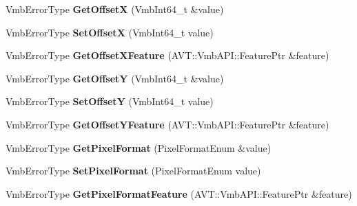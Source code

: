 \begin{DoxyCompactItemize}
\item 
\hypertarget{classMakoCamera_a76b13f9d016ff54f0280801edd307cc5}{Vmb\-Error\-Type {\bfseries Get\-Offset\-X} (Vmb\-Int64\-\_\-t \&value)}\label{classMakoCamera_a76b13f9d016ff54f0280801edd307cc5}

\item 
\hypertarget{classMakoCamera_ae622c0b507b79f37c531b7468c877be9}{Vmb\-Error\-Type {\bfseries Set\-Offset\-X} (Vmb\-Int64\-\_\-t value)}\label{classMakoCamera_ae622c0b507b79f37c531b7468c877be9}

\item 
\hypertarget{classMakoCamera_a89ecbe76ba442ef6b7a00701c9a76c0e}{Vmb\-Error\-Type {\bfseries Get\-Offset\-X\-Feature} (A\-V\-T\-::\-Vmb\-A\-P\-I\-::\-Feature\-Ptr \&feature)}\label{classMakoCamera_a89ecbe76ba442ef6b7a00701c9a76c0e}

\item 
\hypertarget{classMakoCamera_ae31b0f2cc79a408181a33261d3ef4d55}{Vmb\-Error\-Type {\bfseries Get\-Offset\-Y} (Vmb\-Int64\-\_\-t \&value)}\label{classMakoCamera_ae31b0f2cc79a408181a33261d3ef4d55}

\item 
\hypertarget{classMakoCamera_a33e688dd61aeca2136fafc74899effad}{Vmb\-Error\-Type {\bfseries Set\-Offset\-Y} (Vmb\-Int64\-\_\-t value)}\label{classMakoCamera_a33e688dd61aeca2136fafc74899effad}

\item 
\hypertarget{classMakoCamera_a4c01f6af82025406baf51bfaf1bf09c5}{Vmb\-Error\-Type {\bfseries Get\-Offset\-Y\-Feature} (A\-V\-T\-::\-Vmb\-A\-P\-I\-::\-Feature\-Ptr \&feature)}\label{classMakoCamera_a4c01f6af82025406baf51bfaf1bf09c5}

\item 
\hypertarget{classMakoCamera_a3be43b071485db14a0a0841778baf5bd}{Vmb\-Error\-Type {\bfseries Get\-Pixel\-Format} (Pixel\-Format\-Enum \&value)}\label{classMakoCamera_a3be43b071485db14a0a0841778baf5bd}

\item 
\hypertarget{classMakoCamera_add802ac6786b707e11936b54ad4dcdfa}{Vmb\-Error\-Type {\bfseries Set\-Pixel\-Format} (Pixel\-Format\-Enum value)}\label{classMakoCamera_add802ac6786b707e11936b54ad4dcdfa}

\item 
\hypertarget{classMakoCamera_a60797e9f649348283aa3010621b547f1}{Vmb\-Error\-Type {\bfseries Get\-Pixel\-Format\-Feature} (A\-V\-T\-::\-Vmb\-A\-P\-I\-::\-Feature\-Ptr \&feature)}\label{classMakoCamera_a60797e9f649348283aa3010621b547f1}


\end{DoxyCompactItemize}
